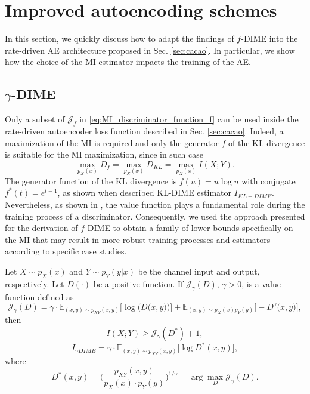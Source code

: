 \section{Improved autoencoding schemes}
\label{sec:fDIME_autoencoders}
In this section, we quickly discuss how to adapt the findings of $f$-DIME into the rate-driven AE architecture proposed in Sec. \ref{sec:cacao}. In particular, we show how the choice of the MI estimator impacts the training of the AE.  

\subsection{$\gamma$-DIME}
\label{subsec:mi_gammaDIME}
Only a subset of $\mathcal{J}_f$ in \eqref{eq:MI_discriminator_function_f} can be used inside the rate-driven autoencoder loss function described in Sec. \ref{sec:cacao}. Indeed, a maximization of the MI is required and only the generator $f$ of the KL divergence is suitable for the MI maximization, since in such case
\begin{equation}
\max_{p_X(x)} D_f = \max_{p_X(x)} D_{KL} = \max_{p_X(x)} I(X;Y).
\end{equation}
The generator function of the KL divergence is $f(u) = u\log u$ with conjugate $f^*(t) = e^{t-1}$, as shown when described KL-DIME estimator $I_{KL-DIME}$. Nevertheless, as shown in \cite{LSGAN}, the value function plays a fundamental role during the training process of a discriminator. Consequently, we used the approach presented for the derivation of $f$-DIME to obtain a family of lower bounds specifically on the MI that may result in more robust training processes and estimators according to specific case studies.

\begin{lemma}
\label{lemma:MI_LemmaKL}
Let $X\sim p_X(x)$ and $Y\sim p_{Y}(y|x)$ be the channel input and output, respectively. Let $D(\cdot)$ be a positive function. If $\mathcal{J}_{\gamma}(D)$, $\gamma>0$, is a value function defined as 
\begin{equation}
\label{eq:MI_value_function_f}
\mathcal{J}_{\gamma}(D) = \gamma \cdot \mathbb{E}_{(x,y) \sim p_{XY}(x,y)}\biggl[\log \biggl(D\bigl(x,y\bigr)\biggr)\biggr] + \mathbb{E}_{(x,y) \sim p_{X}(x)p_{Y}(y)}\biggl[- D^{\gamma}\bigl(x,y\bigr)\biggr],
\end{equation}
then
\begin{equation}
I(X;Y) \geq  \mathcal{J}_{\gamma}(D^*)+1,
\end{equation}
\begin{equation}
\label{eq:MI_gammaDIME}
I_{\gamma DIME} = \gamma \cdot \mathbb{E}_{(x,y) \sim p_{XY}(x,y)}\bigl[\log D^*(x,y) \bigr],
\end{equation}
where
\begin{equation}
\label{eq:MI_optimal_discriminator_gamma}
D^*(x,y) = \biggl(\frac{p_{XY}(x,y)}{p_{X}(x)\cdot p_Y(y)}\biggr)^{1/\gamma} = \arg \max_D \mathcal{J}_{\gamma}(D).
\end{equation}
\end{lemma}

